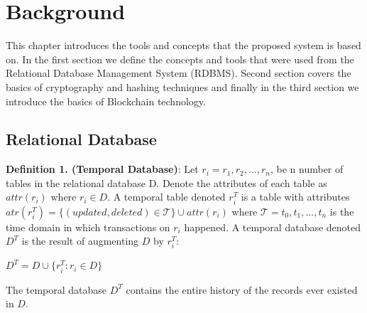 \chapter{Background}
\label{chap:background}

This chapter introduces the tools and concepts that the proposed system is based on. In the first section we define the concepts and tools that were used from the Relational Database Management System (RDBMS). Second section covers the basics of cryptography and hashing techniques and finally in the third section we introduce the basics of Blockchain technology.


\section{Relational Database}


\textbf {Definition 1. (Temporal Database)}:
Let $ r_i = r_1, r_2, ... , r_n$, be n number of tables in the relational database D. Denote the attributes of each table as $attr(r_i)$ where $r_i \in D$. A temporal table denoted $r_i^T$ is a table with attributes $atr(r_i^T) = \{ (updated, deleted) \in \mathcal{T} \}\cup attr(r_i)$ where $\mathcal{T} = t_0,t_1,...,t_n$ is the time domain in which transactions on $r_i$ happened. A temporal database denoted $D^T$ is the result of augmenting $D$ by $r_i^T$:\\
\begin{center}
	{$D^T = D \cup \{{r_i^T}: r_i \in D \}$}
\end{center}
The temporal database $D^T$ contains the entire history of the records ever existed in $D$.\\


